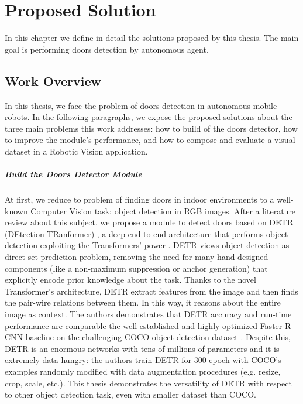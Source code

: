\chapter{Proposed Solution}

In this chapter we define in detail the solutions proposed by this thesis. The main goal is performing doors detection by autonomous agent.

\section{Work Overview}
\label{sec:solution}
In this thesis, we face the problem of doors detection in autonomous mobile robots. In the following paragraphs, we expose the proposed solutions about the three main problems this work addresses: how to build of the doors detector, how to improve the module's performance, and how to compose and evaluate a visual dataset in a Robotic Vision application.

\paragraph{Build the Doors Detector Module} At first, we reduce to problem of finding doors in indoor environments to a well-known Computer Vision task: object detection in RGB images. After a literature review about this subject, we propose a module to detect doors based on DETR (DEtection TRanformer) \cite{detr}, a deep end-to-end architecture that performs object detection exploiting the Transformers' power \cite{transformer}. DETR views object detection as direct set prediction problem, removing the need for many hand-designed components (like a non-maximum suppression or anchor generation) that explicitly encode prior knowledge about the task. Thanks to the novel Transformer's architecture, DETR extract features from the image and then finds the pair-wire relations between them. In this way, it reasons about the entire image as context. The authors demonstrates that DETR accuracy and run-time performance are comparable the well-established and highly-optimized Faster R-CNN baseline \cite{fasterrcnn} on the challenging COCO object detection dataset \cite{coco}. Despite this, DETR is an enormous networks with tens of millions of parameters and it is extremely data hungry: the authors train DETR for 300 epoch with COCO's examples randomly modified with data augmentation procedures (e.g. resize, crop, scale, etc.). This thesis demonstrates the versatility of DETR with respect to other object detection task, even with smaller dataset than COCO.


